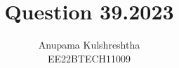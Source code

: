 \documentclass[]{article}
\title{Question 39.2023}
\author{Anupama Kulshreshtha \\ EE22BTECH11009}
\date{}
\begin{document}
\maketitle
\providecommand{\pr}[1]{\ensuremath{\Pr\left(#1\right)}}
\providecommand{\prt}[2]{\ensuremath{p_{#1}^{\left(#2\right)} }}        %
\providecommand{\qfunc}[1]{\ensuremath{Q\left(#1\right)}}
\providecommand{\sbrak}[1]{\ensuremath{{}\left[#1\right]}}
\providecommand{\lsbrak}[1]{\ensuremath{{}\left[#1\right.}}
\providecommand{\rsbrak}[1]{\ensuremath{{}\left.#1\right]}}
\providecommand{\brak}[1]{\ensuremath{\left(#1\right)}}
\providecommand{\lbrak}[1]{\ensuremath{\left(#1\right.}}
\providecommand{\rbrak}[1]{\ensuremath{\left.#1\right)}}
\providecommand{\cbrak}[1]{\ensuremath{\left\{#1\right\}}}
\providecommand{\lcbrak}[1]{\ensuremath{\left\{#1\right.}}
\providecommand{\rcbrak}[1]{\ensuremath{\left.#1\right\}}}
\newcommand{\sgn}{\mathop{\mathrm{sgn}}}
\providecommand{\abs}[1]{\left\vert#1\right\vert}
\providecommand{\res}[1]{\Res\displaylimits_{#1}} 
\providecommand{\norm}[1]{\left\lVert#1\right\rVert}
\providecommand{\mtx}[1]{\mathbf{#1}}
\providecommand{\mean}[1]{E\left[ #1 \right]}
\providecommand{\cond}[2]{#1\middle|#2}
\providecommand{\fourier}{\overset{\mathcal{F}}{ \rightleftharpoons}}
\newenvironment{amatrix}[1]{%
  \left(\begin{array}{@{}*{#1}{c}|c@{}}
}{%
  \end{array}\right)
}
\newcommand{\solution}{\noindent \textbf{Solution: }}
\newcommand{\cosec}{\,\text{cosec}\,}
\providecommand{\dec}[2]{\ensuremath{\overset{#1}{\underset{#2}{\gtrless}}}}
\newcommand{\myvec}[1]{\ensuremath{\begin{pmatrix}#1\end{pmatrix}}}
\newcommand{\mydet}[1]{\ensuremath{\begin{vmatrix}#1\end{vmatrix}}}
\newcommand{\myaugvec}[2]{\ensuremath{\begin{amatrix}{#1}#2\end{amatrix}}}
\providecommand{\rank}{\text{rank}}
\providecommand{\pr}[1]{\ensuremath{\Pr\left(#1\right)}}
\providecommand{\qfunc}[1]{\ensuremath{Q\left(#1\right)}}
	\newcommand*{\permcomb}[4][0mu]{{{}^{#3}\mkern#1#2_{#4}}}
\newcommand*{\perm}[1][-3mu]{\permcomb[#1]{P}}
\newcommand*{\comb}[1][-1mu]{\permcomb[#1]{C}}
\end{document}
